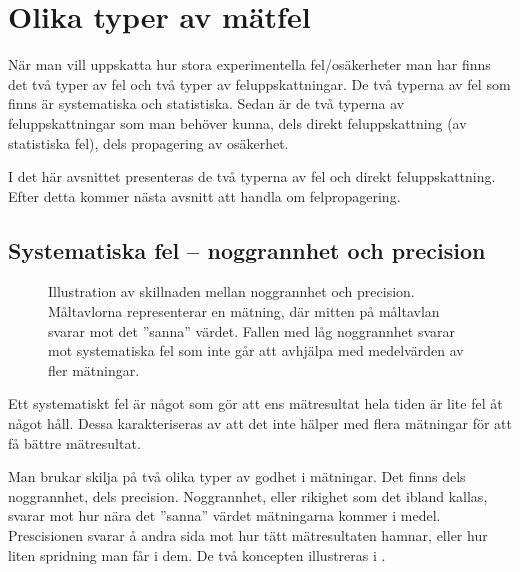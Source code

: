 \documentclass[11pt,a4paper, swedish
]{article}
\begin{document}
\section{Olika typer av mätfel}\label{sec:matfel}
När man vill uppskatta hur stora experimentella fel/osäkerheter man
har finns det två typer av fel och två typer av feluppskattningar. De
två typerna av fel som finns är systematiska och statistiska. Sedan är
de två typerna av feluppskattningar som man behöver kunna, dels direkt
feluppskattning (av statistiska fel), dels propagering av osäkerhet. 

I det här avsnittet presenteras de två typerna av fel och direkt
feluppskattning. Efter detta kommer nästa avsnitt att handla om
felpropagering. 


\subsection{Systematiska fel -- noggrannhet och precision}
\begin{figure}
\centering
\resizebox{0.5\textwidth}{!}{

}
\caption{Illustration av skillnaden mellan noggrannhet och
  precision. Måltavlorna representerar en mätning, där mitten på
  måltavlan svarar mot det ''sanna'' värdet. Fallen med låg
  noggrannhet svarar mot systematiska fel som inte går att avhjälpa
  med medelvärden av fler mätningar.}
\label{fig:prec_nog}
\end{figure}

Ett systematiskt fel är något som gör att ens mätresultat hela tiden
är lite fel åt något håll\footnotemark{}. Dessa karakteriseras av att
det inte hälper med flera mätningar för att få bättre mätresultat.

Man brukar skilja på två olika typer av godhet i mätningar. Det finns
dels noggrannhet, dels precision. Noggrannhet, eller rikighet som det
ibland kallas, svarar mot hur nära det ''sanna''\footnotemark{} värdet
mätningarna kommer i medel. Prescisionen svarar å andra sida mot hur
tätt mätresultaten hamnar, eller hur liten spridning man får i dem. De
två koncepten illustreras i .  
\end{document}

